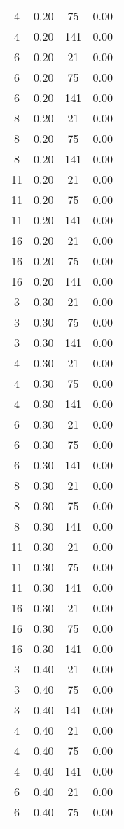 \documentclass[10pt,a4paper]{article}
\begin{document}
\begin{center}
\begin{longtable}{cccc}
4  & 0.20 & 75  & 0.00 \\
4  & 0.20 & 141 & 0.00 \\
6  & 0.20 & 21  & 0.00 \\
6  & 0.20 & 75  & 0.00 \\
6  & 0.20 & 141 & 0.00 \\
8  & 0.20 & 21  & 0.00 \\
8  & 0.20 & 75  & 0.00 \\
8  & 0.20 & 141 & 0.00 \\
11 & 0.20 & 21  & 0.00 \\
11 & 0.20 & 75  & 0.00 \\
11 & 0.20 & 141 & 0.00 \\
16 & 0.20 & 21  & 0.00 \\
16 & 0.20 & 75  & 0.00 \\
16 & 0.20 & 141 & 0.00 \\
3  & 0.30 & 21  & 0.00 \\
3  & 0.30 & 75  & 0.00 \\
3  & 0.30 & 141 & 0.00 \\
4  & 0.30 & 21  & 0.00 \\
4  & 0.30 & 75  & 0.00 \\
4  & 0.30 & 141 & 0.00 \\
6  & 0.30 & 21  & 0.00 \\
6  & 0.30 & 75  & 0.00 \\
6  & 0.30 & 141 & 0.00 \\
8  & 0.30 & 21  & 0.00 \\
8  & 0.30 & 75  & 0.00 \\
8  & 0.30 & 141 & 0.00 \\
11 & 0.30 & 21  & 0.00 \\
11 & 0.30 & 75  & 0.00 \\
11 & 0.30 & 141 & 0.00 \\
16 & 0.30 & 21  & 0.00 \\
16 & 0.30 & 75  & 0.00 \\
16 & 0.30 & 141 & 0.00 \\
3  & 0.40 & 21  & 0.00 \\
3  & 0.40 & 75  & 0.00 \\
3  & 0.40 & 141 & 0.00 \\
4  & 0.40 & 21  & 0.00 \\
4  & 0.40 & 75  & 0.00 \\
4  & 0.40 & 141 & 0.00 \\
6  & 0.40 & 21  & 0.00 \\
6  & 0.40 & 75  & 0.00 \\

\end{longtable}
\end{center}
\end{document}
